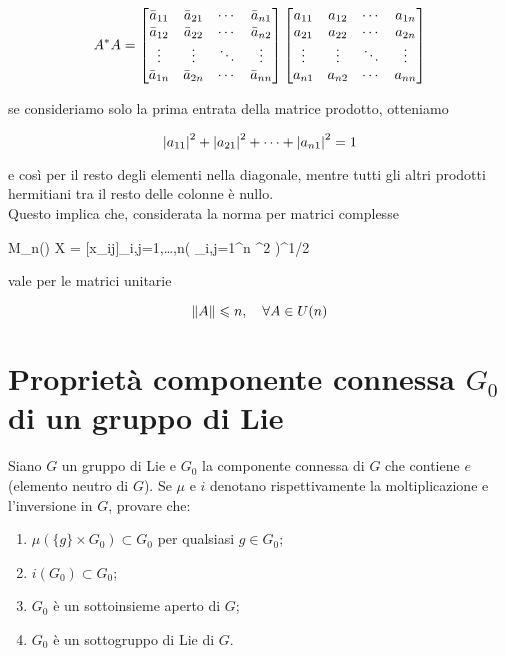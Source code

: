 \begin{equation}
	A^{*} A = %
	\bmqty{ %
		\bar{a}_{11} & \bar{a}_{21} & \cdots & \bar{a}_{n1} \\ %
		\bar{a}_{12} & \bar{a}_{22} & \cdots & \bar{a}_{n2} \\ %
		\vdots & \vdots & \ddots & \vdots \\ %
		\bar{a}_{1n} & \bar{a}_{2n} & \cdots & \bar{a}_{nn}
	}
	\bmqty{ %
		a_{11} & a_{12} & \cdots & a_{1n} \\ %
		a_{21} & a_{22} & \cdots& a_{2n} \\ %
		\vdots & \vdots & \ddots & \vdots \\ %
		a_{n1} & a_{n2} & \cdots & a_{nn}
	}
\end{equation}

se consideriamo solo la prima entrata della matrice prodotto, otteniamo

\begin{equation}
	\abs{a_{11}}^{2} + \abs{a_{21}}^{2} + \cdots + \abs{a_{n1}}^{2} = 1
\end{equation}

e così per il resto degli elementi nella diagonale, mentre tutti gli altri prodotti hermitiani tra il resto delle colonne è nullo.\\
Questo implica che, considerata la norma per matrici complesse

\map{\norm{}}
	{M_{n}(\C)}{\R}
	{X = [x_{ij}]_{i,j=1,\dots,n}}{\left( \sum_{i,j=1}^{n} ^{2} \right)^{1/2}}

vale per le matrici unitarie

\begin{equation}
	\norm{A} \leqslant n \qcomma \forall A \in U(n)
\end{equation}

%

\newpage

%

\section{Proprietà componente connessa $ G_{0} $ di un gruppo di Lie}\label{es3-6}

\begin{tcolorbox}
	Siano $ G $ un gruppo di Lie e $ G_{0} $ la componente connessa di $ G $ che contiene $ e $ (elemento neutro di $ G $). Se $ \mu $ e $ i $ denotano rispettivamente la moltiplicazione e l'inversione in $ G $, provare che:
	
	\begin{enumerate}
		\item $ \mu(\{g\} \times G_{0}) \subset G_{0} $ per qualsiasi $ g \in G_{0} $;
		
		\item $ i(G_{0}) \subset G_{0} $;
		
		\item $ G_{0} $ è un sottoinsieme aperto di $ G $;
		
		\item $ G_{0} $ è un sottogruppo di Lie di $ G $.
	\end{enumerate}
\end{tcolorbox}

